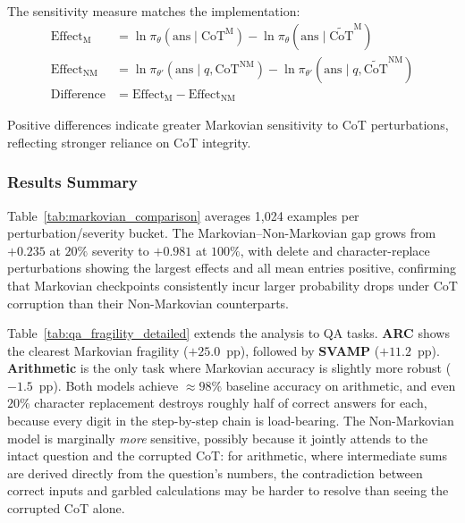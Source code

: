 \documentclass{article} %
\begin{document}
The sensitivity measure matches the implementation:
\begin{align*}
\text{Effect}_{\text{M}} &= \ln \pi_\theta(\text{ans}\mid \text{CoT}^{\text{M}}) - \ln \pi_\theta(\text{ans}\mid \widetilde{\text{CoT}}^{\text{M}}) \\
\text{Effect}_{\text{NM}} &= \ln \pi_{\theta'}(\text{ans}\mid q,\text{CoT}^{\text{NM}}) - \ln \pi_{\theta'}(\text{ans}\mid q,\widetilde{\text{CoT}}^{\text{NM}}) \\
\text{Difference} &= \text{Effect}_{\text{M}} - \text{Effect}_{\text{NM}}
\end{align*}

Positive differences indicate greater Markovian sensitivity to CoT perturbations, reflecting stronger reliance on CoT integrity.

\subsubsection{Results Summary}
Table~\ref{tab:markovian_comparison} averages 1{,}024 examples per perturbation/severity bucket. The Markovian--Non-Markovian gap grows from $+0.235$ at $20\%$ severity to $+0.981$ at $100\%$, with delete and character-replace perturbations showing the largest effects and all mean entries positive, confirming that Markovian checkpoints consistently incur larger probability drops under CoT corruption than their Non-Markovian counterparts.

Table~\ref{tab:qa_fragility_detailed} extends the analysis to QA tasks. \textbf{ARC} shows the clearest Markovian fragility ($+25.0$~pp), followed by \textbf{SVAMP} ($+11.2$~pp). \textbf{Arithmetic} is the only task where Markovian accuracy is slightly more robust ($-1.5$~pp). Both models achieve ${\approx}98\%$ baseline accuracy on arithmetic, and even $20\%$ character replacement destroys roughly half of correct answers for each, because every digit in the step-by-step chain is load-bearing. The Non-Markovian model is marginally \emph{more} sensitive, possibly because it jointly attends to the intact question and the corrupted CoT: for arithmetic, where intermediate sums are derived directly from the question's numbers, the contradiction between correct inputs and garbled calculations may be harder to resolve than seeing the corrupted CoT alone.
\end{document}
